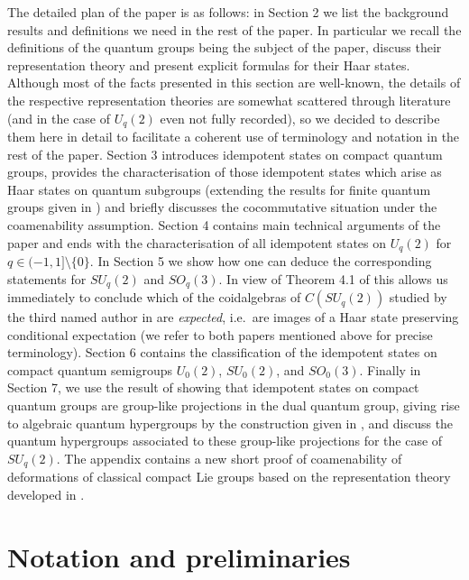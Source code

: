\documentclass[12pt]{amsart}
\theoremstyle{definition}
\theoremstyle{remark}
\numberwithin{equation}{section}
\begin{document}
The detailed plan of the paper is as follows: in Section 2 we list the background results and definitions we need 
in the rest of the paper. In particular we recall the definitions of the quantum groups being the subject of the 
paper, discuss their representation theory and present explicit formulas for their Haar states. Although most of 
the facts presented in this section are well-known, the details of the respective representation theories are 
somewhat scattered through literature (and in the case of $U_q(2)$ even not fully recorded), so we decided to 
describe them here in detail to facilitate a coherent use of terminology and notation in the rest of the paper.  
Section 3 introduces idempotent states on compact quantum groups, provides the characterisation of those 
idempotent states which arise as  Haar states on quantum subgroups (extending the results for finite quantum 
groups given in \cite{franz+skalski08a}) and briefly discusses the cocommutative situation under the 
coamenability assumption. Section 4 contains main technical arguments of the paper and ends with the 
characterisation of all idempotent states on $U_q(2)$ for $q \in (-1,1]\setminus\{0\}$. In Section 5 we show how 
one can deduce the corresponding statements for $SU_q(2)$ and $SO_q(3)$. In view of Theorem 4.1 of 
\cite{franz+skalski09} this allows us immediately to conclude which of the coidalgebras of $C(SU_q(2))$ studied 
by the third named author in \cite{tomatsu08} are \emph{expected}, i.e.\ are images of a Haar state preserving 
conditional expectation  (we refer to both papers mentioned above for precise terminology).  Section 6 contains 
the classification of the idempotent states on compact quantum semigroups $U_0(2)$, $SU_0(2)$, and $SO_0(3)$. 
Finally in Section 7, we use the result of \cite{franz+skalski08a} showing that idempotent states on compact 
quantum groups are group-like projections in the dual quantum group, giving rise to algebraic quantum hypergroups 
by the construction given in \cite{landstad+vandaele07},  and discuss the quantum hypergroups associated to these 
group-like projections for the case of $SU_q(2)$. The appendix contains a new short proof of coamenability of 
deformations of classical compact Lie groups based on the representation theory developed in 
\cite{korogodski+soibelman98}.

\section{Notation and preliminaries}
\end{document}
